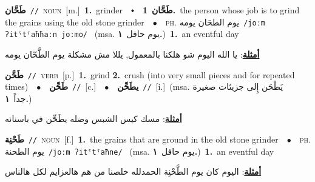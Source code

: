 \documentclass[10pt,a4paper,twoside]{article} %
\begin{document}
\begin{multicols}{2}
{\setlength\topsep{0pt}\textbf{\foreignlanguage{arabic}{طَحَّان}}\ {\color{gray}\texttt{//}\color{black}}\ \textsc{noun}\ [m.]\ \textbf{1.}~grinder\ \ $\smblkdiamond$\ \ \setlength\topsep{0pt}\textbf{\foreignlanguage{arabic}{طَحَّان}}\ \textbf{1.}~the person whose job is to grind the grains using the old stone grinder\ \ $\bullet$\ \ \textsc{ph.} \color{gray} \foreignlanguage{arabic}{يوم الطحَان يومه}\color{black}\ {\color{gray}\texttt{/{\sffamily joːm ʔitˤtˤaħħaːn joːmo}/}\color{black}}\ \color{gray} (msa. \foreignlanguage{arabic}{يوم حافل}~\foreignlanguage{arabic}{\textbf{١.}})\color{black}\ \textbf{1.}~an eventful day\  \begin{flushright}\color{gray}\foreignlanguage{arabic}{\textbf{\underline{\foreignlanguage{arabic}{أمثلة}}}: يا الله اليوم شو هلكنا بالمعمول, يللا مش مشكلة يوم الطََّحّان يومه}\end{flushright}\color{black}} \vspace{2mm}

{\setlength\topsep{0pt}\textbf{\foreignlanguage{arabic}{طَحَّن}}\ {\color{gray}\texttt{//}\color{black}}\ \textsc{verb}\ [p.]\ \textbf{1.}~grind  \textbf{2.}~crush (into very small pieces and for repeated times)\ \ $\bullet$\ \ \setlength\topsep{0pt}\textbf{\foreignlanguage{arabic}{طَحِّن}}\ {\color{gray}\texttt{//}\color{black}}\ [c.]\ \ $\bullet$\ \ \setlength\topsep{0pt}\textbf{\foreignlanguage{arabic}{يطَحِّن}}\ {\color{gray}\texttt{//}\color{black}}\ [i.]\ \color{gray}(msa. \foreignlanguage{arabic}{يَطْحَن إِلى جزيئات صغيرة جداً}~\foreignlanguage{arabic}{\textbf{١.}})\color{black}\  \begin{flushright}\color{gray}\foreignlanguage{arabic}{\textbf{\underline{\foreignlanguage{arabic}{أمثلة}}}: مسك كيس الشبس وضله يطَحِّن في باسنانه}\end{flushright}\color{black}} \vspace{2mm}

{\setlength\topsep{0pt}\textbf{\foreignlanguage{arabic}{طَحْنِة}}\ {\color{gray}\texttt{//}\color{black}}\ \textsc{noun}\ [f.]\ \textbf{1.}~the grains that are ground in the old stone grinder\ \ $\bullet$\ \ \textsc{ph.} \color{gray} \foreignlanguage{arabic}{يوم الطحنة}\color{black}\ {\color{gray}\texttt{/{\sffamily joːm ʔitˤtˤaħne}/}\color{black}}\ \color{gray} (msa. \foreignlanguage{arabic}{يوم حافل}~\foreignlanguage{arabic}{\textbf{١.}})\color{black}\ \textbf{1.}~an eventful day\  \begin{flushright}\color{gray}\foreignlanguage{arabic}{\textbf{\underline{\foreignlanguage{arabic}{أمثلة}}}: اليوم كان يوم الطَّحْنِة الحمدلله خلصنا من هم هالعزايم لكل هالناس}\end{flushright}\color{black}} \vspace{2mm}


\end{multicols}
\end{document}
